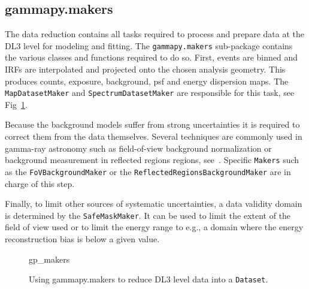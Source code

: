 \subsection{gammapy.makers}
\label{ssec:gammapy-makers}

The data reduction contains all tasks required to process and prepare data at
the DL3 level for modeling and fitting. The \texttt{gammapy.makers} sub-package
contains the various classes and functions required to do so. First, events are
binned and IRFs are interpolated and projected onto the chosen analysis
geometry. This produces counts, exposure, background, psf and energy dispersion
maps. The \texttt{MapDatasetMaker} and \texttt{SpectrumDatasetMaker} are
responsible for this task, see Fig~\ref{ig*:minted:gp_makers}.

Because the background models suffer from strong uncertainties it is required
to correct them from the data themselves. Several techniques are commonly used
in gamma-ray astronomy such as field-of-view background normalization or
background measurement in reflected regions regions, see~\cite{Berge07}.
Specific \texttt{Makers} such as the \texttt{FoVBackgroundMaker} or the
\texttt{ReflectedRegionsBackgroundMaker} are in charge of this step.

Finally, to limit other sources of systematic uncertainties, a data validity
domain is determined by the \texttt{SafeMaskMaker}. It can be used to limit the
extent of the field of view used or to limit the energy range to e.g., a domain
where the energy reconstruction bias is below a given value.

\begin{figure}
	{gp_makers}

	\caption{Using gammapy.makers to reduce DL3 level data into a
		\texttt{Dataset}.}
	\label{ig*:minted:gp_makers}
\end{figure}
